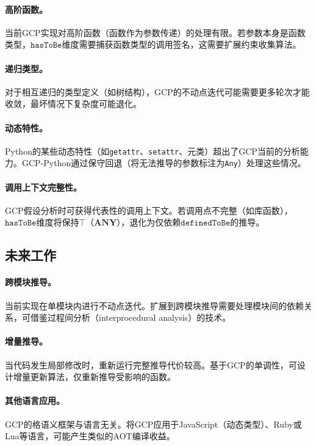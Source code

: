 \documentclass[UTF8]{article}
\newcommand{\ANY}{\mathbf{ANY}}
\newcommand{\hasToBe}{\texttt{hasToBe}}
\newcommand{\definedToBe}{\texttt{definedToBe}}
\begin{document}
\paragraph{高阶函数。}
当前GCP实现对高阶函数（函数作为参数传递）的处理有限。若参数本身是函数类型，$\hasToBe$维度需要捕获函数类型的调用签名，这需要扩展约束收集算法。

\paragraph{递归类型。}
对于相互递归的类型定义（如树结构），GCP的不动点迭代可能需要更多轮次才能收敛，最坏情况下复杂度可能退化。

\paragraph{动态特性。}
Python的某些动态特性（如\texttt{getattr}、\texttt{setattr}、元类）超出了GCP当前的分析能力。GCP-Python通过保守回退（将无法推导的参数标注为\texttt{Any}）处理这些情况。

\paragraph{调用上下文完整性。}
GCP假设分析时可获得代表性的调用上下文。若调用点不完整（如库函数），$\hasToBe$维度将保持$\top$（$\ANY$），退化为仅依赖$\definedToBe$的推导。

\subsection{未来工作}

\paragraph{跨模块推导。}
当前实现在单模块内进行不动点迭代。扩展到跨模块推导需要处理模块间的依赖关系，可借鉴过程间分析（interprocedural analysis）的技术。

\paragraph{增量推导。}
当代码发生局部修改时，重新运行完整推导代价较高。基于GCP的单调性，可设计增量更新算法，仅重新推导受影响的函数。

\paragraph{其他语言应用。}
GCP的格语义框架与语言无关。将GCP应用于JavaScript（动态类型）、Ruby或Lua等语言，可能产生类似的AOT编译收益。
\end{document}
